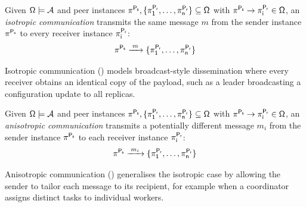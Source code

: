 \documentclass[runningheads]{llncs}
\begin{document}
\begin{definition}\label{def:isotropic}
  Given $\mathsf{\Omega} \models \mathcal{A}$ and peer instances $\mathsf{\pi_{}^{P_s}}, \{\mathsf{\pi_{1}^{P_r}}, \ldots, \mathsf{\pi_{n}^{P_r}}\} \subseteq \mathsf{\Omega}$ with $\mathsf{\mathsf{\pi_{}^{P_s}} \rightarrow \mathsf{\pi_{i}^{P_r}}} \in \mathsf{\Omega}$,
  an \emph{isotropic communication} transmits the same message $m$ from the sender instance $\mathsf{\pi_{}^{P_s}}$ to every receiver instance $\mathsf{\pi_{i}^{P_r}}$:
\[
  \mathsf{\pi_{}^{P_s}} \xrightarrow{\;m\;} \{\mathsf{\pi_{1}^{P_r}}, \ldots, \mathsf{\pi_{n}^{P_r}}\}
\]
\end{definition}
%
Isotropic communication () models broadcast-style dissemination
where every receiver obtains an identical copy of the payload,
such as a leader broadcasting a configuration update to all replicas.

\begin{definition}\label{def:anisotropic}
  Given $\mathsf{\Omega} \models \mathcal{A}$ and peer instances $\mathsf{\pi_{}^{P_s}}, \{\mathsf{\pi_{1}^{P_r}}, \ldots, \mathsf{\pi_{n}^{P_r}}\} \subseteq \mathsf{\Omega}$ with $\mathsf{\mathsf{\pi_{}^{P_s}} \rightarrow \mathsf{\pi_{i}^{P_r}}} \in \mathsf{\Omega}$,
  an \emph{anisotropic communication} transmits a potentially different message $m_i$ from the sender instance $\mathsf{\pi_{}^{P_s}}$ to each receiver instance $\mathsf{\pi_{i}^{P_r}}$:
\[
  \mathsf{\pi_{}^{P_s}} \xrightarrow{\;m_i\;} \{\mathsf{\pi_{1}^{P_r}}, \ldots, \mathsf{\pi_{n}^{P_r}}\}
\]
\end{definition}
%
Anisotropic communication () generalises the isotropic case
by allowing the sender to tailor each message to its recipient,
for example when a coordinator assigns distinct tasks to individual workers.
\end{document}
